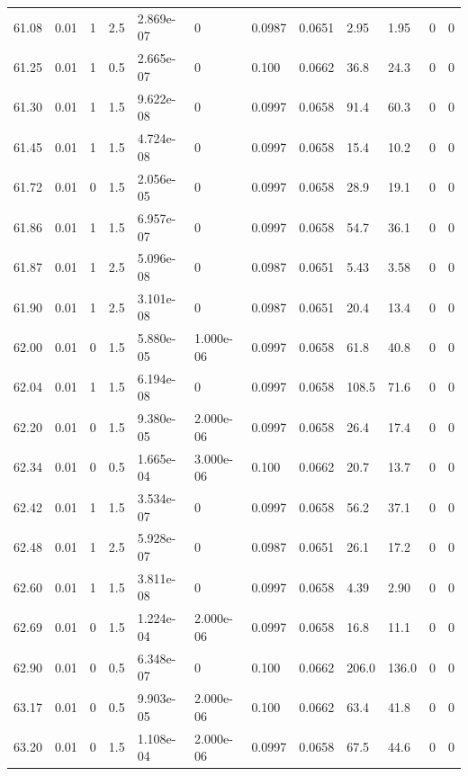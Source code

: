 \documentclass[preview]{standalone}
\begin{document}
{{{{{{{{{{{{{{\begin{tabular}{L{1.2cm}C{1.2cm} C{0.3cm}C{0.5cm} C{1.4cm}C{1.4cm} C{1.4cm}C{1.4cm} C{1.6cm}C{1.6cm} C{1.6cm}C{1.6cm}}
  61.08  &  0.01  & 1     & 2.5 &  2.869e-07  & 0  &  0.0987&   0.0651& 2.95 & 1.95   &  0 & 0  \\ 
  61.25  &  0.01  & 1     & 0.5 &  2.665e-07  & 0  &  0.100&   0.0662& 36.8 & 24.3   &  0 & 0  \\ 
  61.30  &  0.01  & 1     & 1.5 &  9.622e-08  & 0  &  0.0997&   0.0658& 91.4 & 60.3   &  0 & 0  \\ 
  61.45  &  0.01  & 1     & 1.5 &  4.724e-08  & 0  &  0.0997&   0.0658& 15.4 & 10.2   &  0 & 0  \\ 
  61.72  &  0.01  & 0     & 1.5 &  2.056e-05  & 0  &  0.0997&   0.0658& 28.9 & 19.1   &  0 & 0  \\ 
  61.86  &  0.01  & 1     & 1.5 &  6.957e-07  & 0  &  0.0997&   0.0658& 54.7 & 36.1   &  0 & 0  \\ 
  61.87  &  0.01  & 1     & 2.5 &  5.096e-08  & 0  &  0.0987&   0.0651& 5.43 & 3.58   &  0 & 0  \\ 
  61.90  &  0.01  & 1     & 2.5 &  3.101e-08  & 0  &  0.0987&   0.0651& 20.4 & 13.4   &  0 & 0  \\ 
  62.00  &  0.01  & 0     & 1.5 &  5.880e-05  & 1.000e-06  &  0.0997&   0.0658& 61.8 & 40.8   &  0 & 0  \\ 
  62.04  &  0.01  & 1     & 1.5 &  6.194e-08  & 0  &  0.0997&   0.0658& 108.5 & 71.6   &  0 & 0  \\ 
  62.20  &  0.01  & 0     & 1.5 &  9.380e-05  & 2.000e-06  &  0.0997&   0.0658& 26.4 & 17.4   &  0 & 0  \\ 
  62.34  &  0.01  & 0     & 0.5 &  1.665e-04  & 3.000e-06  &  0.100&   0.0662& 20.7 & 13.7   &  0 & 0  \\ 
  62.42  &  0.01  & 1     & 1.5 &  3.534e-07  & 0  &  0.0997&   0.0658& 56.2 & 37.1   &  0 & 0  \\ 
  62.48  &  0.01  & 1     & 2.5 &  5.928e-07  & 0  &  0.0987&   0.0651& 26.1 & 17.2   &  0 & 0  \\ 
  62.60  &  0.01  & 1     & 1.5 &  3.811e-08  & 0  &  0.0997&   0.0658& 4.39 & 2.90   &  0 & 0  \\ 
  62.69  &  0.01  & 0     & 1.5 &  1.224e-04  & 2.000e-06  &  0.0997&   0.0658& 16.8 & 11.1   &  0 & 0  \\ 
  62.90  &  0.01  & 0     & 0.5 &  6.348e-07  & 0  &  0.100&   0.0662& 206.0 & 136.0   &  0 & 0  \\ 
  63.17  &  0.01  & 0     & 0.5 &  9.903e-05  & 2.000e-06  &  0.100&   0.0662& 63.4 & 41.8   &  0 & 0  \\ 
  63.20  &  0.01  & 0     & 1.5 &  1.108e-04  & 2.000e-06  &  0.0997&   0.0658& 67.5 & 44.6   &  0 & 0  \\ 

\end{tabular}}}}}}}}}}}}}}}
\end{document}

